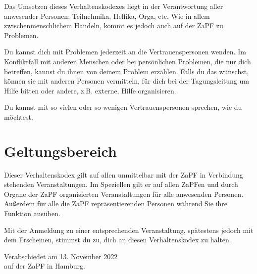 \documentclass[DIV=calc]{scrartcl}
\begin{document}
Das Umsetzen dieses Verhaltenskodexes liegt in der Verantwortung aller
anwesender Personen; Teilnehmika, Helfika, Orga, etc. Wie in allem
zwischenmenschlichem Handeln, kommt es jedoch auch auf der ZaPF zu
Problemen.

Du kannst dich mit Problemen jederzeit an die Vertrauenspersonen wenden.
Im Konfliktfall mit anderen Menschen oder bei persönlichen Problemen,
die nur dich betreffen, kannst du ihnen von deinem Problem erzählen.
Falls du das wünschst, können sie mit anderen Personen vermitteln, für
dich bei der Tagungsleitung um Hilfe bitten oder andere, z.B. externe,
Hilfe organisieren.

Du kannst mit so vielen oder so wenigen Vertrauenspersonen sprechen, wie
du möchtest.

\hypertarget{geltungsbereich}{%
\section*{Geltungsbereich}\label{geltungsbereich}}

Dieser Verhaltenskodex gilt auf allen unmittelbar mit der ZaPF in
Verbindung stehenden Veranstaltungen. Im Speziellen gilt er auf allen
ZaPFen und durch Organe der ZaPF organisierten Veranstaltungen für alle
anwesenden Personen. Außerdem für alle die ZaPF repräsentierenden
Personen während Sie ihre Funktion ausüben.

Mit der Anmeldung zu einer entsprechenden Veranstaltung, spätestens
jedoch mit dem Erscheinen, stimmst du zu, dich an diesen Verhaltenskodex
zu halten.


\vspace{1cm} 

\vfill
\begin{flushright}
	Verabschiedet am 13. November 2022 \\
	auf der ZaPF in Hamburg.
\end{flushright}
\end{document}
